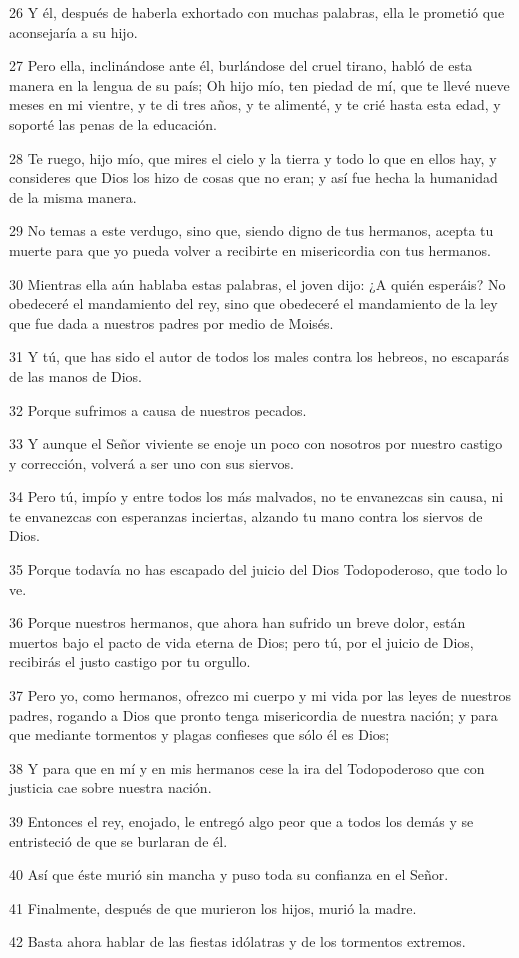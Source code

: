 \par 26 Y él, después de haberla exhortado con muchas palabras, ella le prometió que aconsejaría a su hijo.
\par 27 Pero ella, inclinándose ante él, burlándose del cruel tirano, habló de esta manera en la lengua de su país; Oh hijo mío, ten piedad de mí, que te llevé nueve meses en mi vientre, y te di tres años, y te alimenté, y te crié hasta esta edad, y soporté las penas de la educación.
\par 28 Te ruego, hijo mío, que mires el cielo y la tierra y todo lo que en ellos hay, y consideres que Dios los hizo de cosas que no eran; y así fue hecha la humanidad de la misma manera.
\par 29 No temas a este verdugo, sino que, siendo digno de tus hermanos, acepta tu muerte para que yo pueda volver a recibirte en misericordia con tus hermanos.
\par 30 Mientras ella aún hablaba estas palabras, el joven dijo: ¿A quién esperáis? No obedeceré el mandamiento del rey, sino que obedeceré el mandamiento de la ley que fue dada a nuestros padres por medio de Moisés.
\par 31 Y tú, que has sido el autor de todos los males contra los hebreos, no escaparás de las manos de Dios.
\par 32 Porque sufrimos a causa de nuestros pecados.
\par 33 Y aunque el Señor viviente se enoje un poco con nosotros por nuestro castigo y corrección, volverá a ser uno con sus siervos.
\par 34 Pero tú, impío y entre todos los más malvados, no te envanezcas sin causa, ni te envanezcas con esperanzas inciertas, alzando tu mano contra los siervos de Dios.
\par 35 Porque todavía no has escapado del juicio del Dios Todopoderoso, que todo lo ve.
\par 36 Porque nuestros hermanos, que ahora han sufrido un breve dolor, están muertos bajo el pacto de vida eterna de Dios; pero tú, por el juicio de Dios, recibirás el justo castigo por tu orgullo.
\par 37 Pero yo, como hermanos, ofrezco mi cuerpo y mi vida por las leyes de nuestros padres, rogando a Dios que pronto tenga misericordia de nuestra nación; y para que mediante tormentos y plagas confieses que sólo él es Dios;
\par 38 Y para que en mí y en mis hermanos cese la ira del Todopoderoso que con justicia cae sobre nuestra nación.
\par 39 Entonces el rey, enojado, le entregó algo peor que a todos los demás y se entristeció de que se burlaran de él.
\par 40 Así que éste murió sin mancha y puso toda su confianza en el Señor.
\par 41 Finalmente, después de que murieron los hijos, murió la madre.
\par 42 Basta ahora hablar de las fiestas idólatras y de los tormentos extremos.


